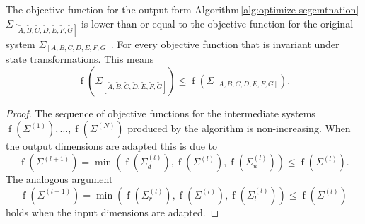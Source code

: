 \documentclass[doctype=mastersthesis,BCOR=15mm,biblatex]{ldvbook}%
\DeclareMathOperator{\f}{f}
\newcommand{\sys}{\Sigma}
\begin{document}
The objective function for the output form Algorithm\,\ref{alg:optimize segemtnation} $\Sigma_{[\tilde{A},\tilde{B},\tilde{C},\tilde{D},\tilde{E},\tilde{F},\tilde{G}]}$ is lower than or equal to the objective function for the original system $\Sigma_{[A,B,C,D,E,F,G]}$.
For every objective function that is invariant under state transformations.
This means 
\begin{equation}
	\f(\Sigma_{[\tilde{A},\tilde{B},\tilde{C},\tilde{D},\tilde{E},\tilde{F},\tilde{G}]}) \leq \f(\Sigma_{[A,B,C,D,E,F,G]})
	.
\end{equation}
\begin{proof}
	 The sequence of objective functions for the intermediate systems $\f(\sys^{(1)}),\dots,\f(\sys^{(N)})$ produced by the algorithm is non-increasing.
	 When the output dimensions are adapted this is due to  
	\begin{equation}
	\f(\sys^{(l+1)}) = \min(\f(\sys^{(l)}_{d}),\f(\sys^{(l)}),\f(\sys^{(l)}_{u})) \leq \f(\sys^{(l)})
	.
	\end{equation}
	The analogous argument 
	\begin{equation}
	\f(\sys^{(l+1)}) = \min(\f(\sys^{(l)}_{r}),\f(\sys^{(l)}),\f(\sys^{(l)}_{l})) \leq \f(\sys^{(l)})
	\end{equation} 
	holds when the input dimensions are adapted.
\end{proof}
\end{document}

